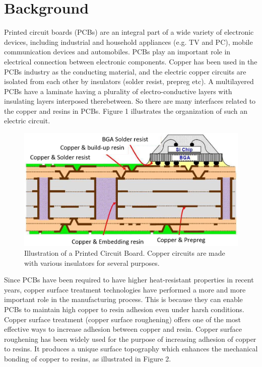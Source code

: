 \documentclass[10pt,twocolumn,letterpaper]{article}
\begin{document}
\section{Background}

Printed circuit boards (PCBs) are an integral part of a wide variety of electronic devices, 
including industrial and household appliances (e.g. TV and PC), 
mobile communication devices and automobiles. 
PCBs play an important role in electrical connection between electronic components. 
Copper has been used in the PCBs industry as the conducting material, 
and the electric copper circuits are isolated from each other by insulators (solder resist, prepreg etc). 
A multilayered PCBs have a laminate having a plurality of electro-conductive 
layers with insulating layers interposed therebetween. 
So there are many interfaces related to the copper and resins in PCBs. 
Figure 1 illustrates the organization of such an electric circuit.


\begin{figure}[h]
\centering
\includegraphics[width=0.9\linewidth]{"./figures/Figure1"}
\caption{
Illustration of a Printed Circuit Board. 
Copper circuits are made with various insulators for several purposes.  
}
\end{figure}


Since PCBs have been required to have higher heat-resistant properties in recent years, 
copper surface treatment technologies have performed a more and more important role in the manufacturing process. 
This is because they can enable PCBs to maintain high copper to resin adhesion even under harsh conditions. 
Copper surface treatment (copper surface roughening) offers one of the most effective ways to increase adhesion between copper and resin. 
Copper surface roughening has been widely used for the purpose of increasing adhesion of copper to resins. 
It produces a unique surface topography which enhances the mechanical bonding of copper to resins, as illustrated in Figure 2.
\end{document}
